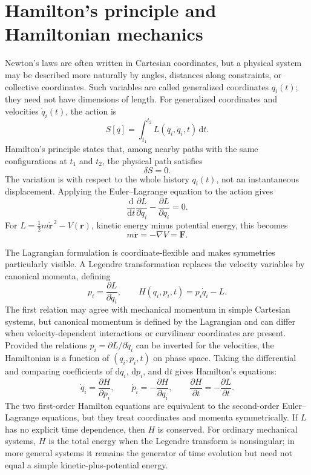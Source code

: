 \section{Hamilton's principle and Hamiltonian mechanics}

Newton's laws are often written in Cartesian coordinates, but a physical system may be described more naturally by angles, distances along constraints, or collective coordinates. Such variables are called generalized coordinates $q_i(t)$; they need not have dimensions of length. For generalized coordinates and velocities $\dot q_i(t)$, the action is
\begin{equation}
S[q]=\int_{t_1}^{t_2}L(q_i,\dot q_i,t)\,\mathrm{d}t.
\end{equation}
Hamilton's principle states that, among nearby paths with the same configurations at $t_1$ and $t_2$, the physical path satisfies
\begin{equation}
\delta S=0.
\end{equation}
The variation is with respect to the whole history $q_i(t)$, not an instantaneous displacement. Applying the Euler--Lagrange equation to the action gives
\begin{equation}
\frac{\mathrm{d}}{\mathrm{d}t}\frac{\partial L}{\partial\dot q_i}
-\frac{\partial L}{\partial q_i}=0.
\end{equation}
For $L=\frac12m\dot{\mathbf r}^{\,2}-V(\mathbf r)$, kinetic energy minus potential energy, this becomes
\begin{equation}
m\ddot{\mathbf r}=-\nabla V=\mathbf F.
\end{equation}

The Lagrangian formulation is coordinate-flexible and makes symmetries particularly visible. A Legendre transformation replaces the velocity variables by canonical momenta, defining
\begin{equation}
p_i=\frac{\partial L}{\partial\dot q_i},
\qquad
H(q_i,p_i,t)=p_i\dot q_i-L.
\end{equation}
The first relation may agree with mechanical momentum in simple Cartesian systems, but canonical momentum is defined by the Lagrangian and can differ when velocity-dependent interactions or curvilinear coordinates are present. Provided the relations $p_i=\partial L/\partial\dot q_i$ can be inverted for the velocities, the Hamiltonian is a function of $(q_i,p_i,t)$ on phase space. Taking the differential and comparing coefficients of $
\mathrm{d}q_i$, $\mathrm{d}p_i$, and $\mathrm{d}t$ gives Hamilton's equations:
\begin{equation}
\dot q_i=\frac{\partial H}{\partial p_i},
\qquad
\dot p_i=-\frac{\partial H}{\partial q_i},
\qquad
\frac{\partial H}{\partial t}=-\frac{\partial L}{\partial t}.
\end{equation}
The two first-order Hamilton equations are equivalent to the second-order Euler--Lagrange equations, but they treat coordinates and momenta symmetrically. If $L$ has no explicit time dependence, then $H$ is conserved. For ordinary mechanical systems, $H$ is the total energy when the Legendre transform is nonsingular; in more general systems it remains the generator of time evolution but need not equal a simple kinetic-plus-potential energy.